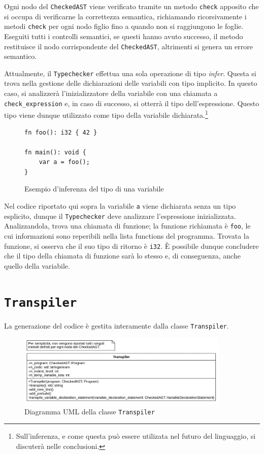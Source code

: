 Ogni nodo del \texttt{CheckedAST} viene verificato tramite un metodo \texttt{check} apposito che si occupa di verificarne la correttezza semantica, richiamando ricorsivamente i metodi \texttt{check} per ogni nodo figlio fino a quando non si raggiungono le foglie. Eseguiti tutti i controlli semantici, se questi hanno avuto successo, il metodo restituisce il nodo corrispondente del \texttt{CheckedAST}, altrimenti si genera un errore semantico.

Attualmente, il \texttt{Typechecker} effettua una sola operazione di tipo \textit{infer}. Questa si trova nella gestione delle dichiarazioni delle variabili con tipo implicito. In questo caso, si analizzer\`a l'inizializzatore della variabile con una chiamata a \texttt{check\_expression} e, in caso di successo, si otterr\`a il tipo dell'espressione. Questo tipo viene dunque utilizzato come tipo della variabile dichiarata.\footnote{Sull'inferenza, e come questa pu\`o essere utilizata nel futuro del linguaggio, si discuter\`a nelle conclusioni.}

\begin{figure}[H]
	\centering
	\begin{verbatim}
fn foo(): i32 { 42 }

fn main(): void {
    var a = foo();
}
  \end{verbatim}
	\caption{Esempio d'inferenza del tipo di una variabile}
	\label{fig:typechecker-var-decl-infer}
\end{figure}

Nel codice riportato qui sopra la variabile \texttt{a} viene dichiarata senza un tipo esplicito, dunque il \texttt{Typechecker} deve analizzare l'espressione inizializzata. Analizzandola, trova una chiamata di funzione; la funzione richiamata è \texttt{foo}, le cui informazioni sono reperibili nella lista functions del programma. Trovata la funzione, si osserva che il suo tipo di ritorno è \texttt{i32}. È possibile dunque concludere che il tipo della chiamata di funzione sarà lo stesso e, di conseguenza, anche quello della variabile.

\section{\texttt{Transpiler}}
\label{sec:transpiler}

La generazione del codice \`e gestita interamente dalla classe \texttt{Transpiler}.

\begin{figure}[H]
	\centering
	\includegraphics[width=0.9\textwidth]{figures/transpiler.png}
	\caption{Diagramma UML della classe \texttt{Transpiler}}
	\label{fig:transpiler-uml}
\end{figure}

